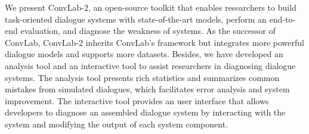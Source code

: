 We present ConvLab-2, an open-source toolkit that enables researchers to build task-oriented dialogue systems with state-of-the-art models, perform an end-to-end evaluation, and diagnose the weakness of systems. As the successor of ConvLab, ConvLab-2 inherits ConvLab's framework but integrates more powerful dialogue models and supports more datasets. Besides, we have developed an analysis tool and an interactive tool to assist researchers in diagnosing dialogue systems. The analysis tool presents rich statistics and summarizes common mistakes from simulated dialogues, which facilitates error analysis and system improvement. The interactive tool provides an user interface that allows developers to diagnose an assembled dialogue system by interacting with the system and modifying the output of each system component.
